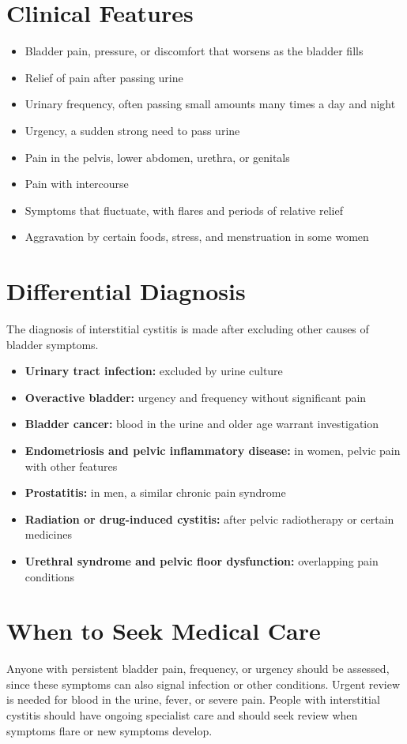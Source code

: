 \section*{Clinical Features}
\begin{itemize}
    \item Bladder pain, pressure, or discomfort that worsens as the bladder fills
    \item Relief of pain after passing urine
    \item Urinary frequency, often passing small amounts many times a day and night
    \item Urgency, a sudden strong need to pass urine
    \item Pain in the pelvis, lower abdomen, urethra, or genitals
    \item Pain with intercourse
    \item Symptoms that fluctuate, with flares and periods of relative relief
    \item Aggravation by certain foods, stress, and menstruation in some women
\end{itemize}

\section*{Differential Diagnosis}
The diagnosis of interstitial cystitis is made after excluding other causes of bladder symptoms.
\begin{itemize}
    \item \textbf{Urinary tract infection:} excluded by urine culture
    \item \textbf{Overactive bladder:} urgency and frequency without significant pain
    \item \textbf{Bladder cancer:} blood in the urine and older age warrant investigation
    \item \textbf{Endometriosis and pelvic inflammatory disease:} in women, pelvic pain with other features
    \item \textbf{Prostatitis:} in men, a similar chronic pain syndrome
    \item \textbf{Radiation or drug-induced cystitis:} after pelvic radiotherapy or certain medicines
    \item \textbf{Urethral syndrome and pelvic floor dysfunction:} overlapping pain conditions
\end{itemize}

\section*{When to Seek Medical Care}
Anyone with persistent bladder pain, frequency, or urgency should be assessed, since these symptoms can also signal infection or other conditions. Urgent review is needed for blood in the urine, fever, or severe pain. People with interstitial cystitis should have ongoing specialist care and should seek review when symptoms flare or new symptoms develop.

